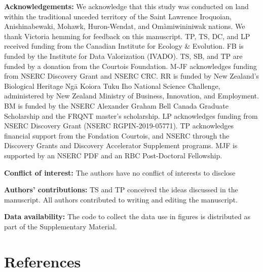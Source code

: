 \documentclass[
  letterpaper,
  DIV=11,
  numbers=noendperiod]{scrartcl}
\begin{document}
\textbf{Acknowledgements:} We acknowledge that this study was conducted
on land within the traditional unceded territory of the Saint Lawrence
Iroquoian, Anishinabewaki, Mohawk, Huron-Wendat, and Omàmiwininiwak
nations. We thank Victoria hemming for feedback on this manuscript. TP,
TS, DC, and LP received funding from the Canadian Institute for Ecology
\& Evolution. FB is funded by the Institute for Data Valorization
(IVADO). TS, SB, and TP are funded by a donation from the Courtois
Foundation. M-JF acknowledges funding from NSERC Discovery Grant and
NSERC CRC. RR is funded by New Zealand's Biological Heritage Ngā Koiora
Tuku Iho National Science Challenge, administered by New Zealand
Ministry of Business, Innovation, and Employment. BM is funded by the
NSERC Alexander Graham Bell Canada Graduate Scholarship and the FRQNT
master's scholarship. LP acknowledges funding from NSERC Discovery Grant
(NSERC RGPIN-2019-05771). TP acknowledges financial support from the
Fondation Courtois, and NSERC through the Discovery Grants and Discovery
Accelerator Supplement programs. MJF is supported by an NSERC PDF and an
RBC Post-Doctoral Fellowship.

\textbf{Conflict of interest:} The authors have no conflict of interests
to disclose

\textbf{Authors' contributions:} TS and TP conceived the ideas discussed
in the manuscript. All authors contributed to writing and editing the
manuscript.

\textbf{Data availability:} The code to collect the data use in figures
is distributed as part of the Supplementary Material.

\hypertarget{references}{%
\section*{References}\label{references}}
\end{document}
